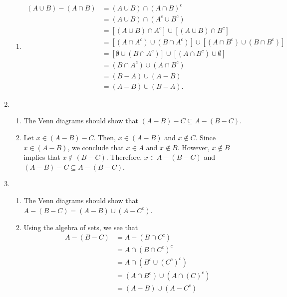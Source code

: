 \begin{enumerate}
\begin{enumerate}
\item \begin{align*}
(A \cup B) - (A \cap B) &= (A \cup B) \cap (A \cap B)^c \\
                        &= (A \cup B) \cap (A^c \cup B^c) \\
               &= \left[ (A \cup B) \cap A^c \right] \cup \left[ (A \cup B) \cap B^c \right] \\
               &= \left[ (A \cap A^c) \cup (B \cap A^c) \right] \cup \left[ (A \cap B^c) \cup (B \cap B^c) \right] \\
               &= \left[ \emptyset \cup (B \cap A^c) \right] \cup \left[ (A \cap B^c) \cup \emptyset \right] \\
               &= (B \cap A^c) \cup (A \cap B^c) \\
               &= (B - A) \cup (A - B) \\
               &= (A - B) \cup (B - A).
\end{align*}
\end{enumerate}



\item \begin{enumerate}
\item The Venn diagrams should show that $\left( A - B \right) - C \subseteq A - \left( B - C \right)$.

\item Let $x \in \left( A - B \right) - C$.  Then, $x \in \left( A - B \right)$ and 
$x \notin C$.  Since $x \in \left( A - B \right)$, we conclude that $x \in A$ and $x \notin B$.  However,\linebreak
$x \notin B$ implies that $x \notin \left( B - C \right)$.  Therefore, 
$x \in A - \left( B - C \right)$ and $\left( A - B \right) - C \subseteq A - \left( B - C \right)$.
\end{enumerate}


\item \begin{enumerate}
\item The Venn diagrams should show that $A - (B - C) = (A - B) \cup \left( A - C^c \right)$.

\item Using the algebra of sets, we see that
\begin{align*}
A - (B - C) &= A -  \left(B \cap C^c \right)\\
            &= A \cap \left(B \cap C^c \right)^c \\
            &= A \cap \left( B^c \cup \left( C^c \right)^c \right) \\
            &= \left( A \cap B^c \right) \cup \left( A \cap \left( C \right)^c \right) \\
            &= (A - B) \cup \left( A - C^c \right)
\end{align*}


\end{enumerate}
\end{enumerate}
